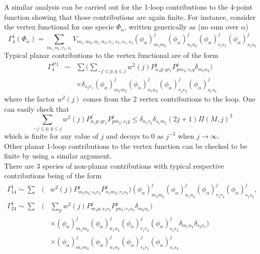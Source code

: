 \documentclass[10pt]{book}
\theoremstyle{break}
\begin{document}
A similar analysis can be carried out for the 1-loop contributions to the 4-point function showing that those contributions are again finite. For instance, consider the vertex functional for one specie $\Phi_\alpha$, written generically as (no sum over $\alpha$)
\begin{equation*}
\Gamma^1_4(\Phi_\alpha)=\sum_{m_i,n_i,r_i,s_i} V_{m_1,m_2,n_1,n_2,r_1,r_2,s_1,s_2}(\phi_\alpha)^j_{m_1m_2}(\phi_\alpha)^j_{n_1n_2}(\phi_\alpha)^j_{r_1r_2}(\phi_\alpha)^j_{s_1s_2}%
\end{equation*}
Typical planar contributions to the vertex functional are of the form
\begin{eqnarray*}
\Gamma^{P\ 1}_4&\sim&\sum\big(\sum_{-j\le p,q\le j}w^2(j)P^j_{n_1p;qr_2}P^j_{pm_2;s_1q}\delta_{m_1n_2}\big)\nonumber\\
&&\times\delta_{s_2r_1} (\phi_\alpha)^j_{m_1m_2}(\phi_\alpha)^j_{n_1n_2}(\phi_\alpha)^j_{r_1r_2}(\phi_\alpha)^j_{s_1s_2}%
\end{eqnarray*}
where the factor $w^2(j)$ comes from the 2 vertex contributions to the loop. One can easily check that
\begin{equation*}
\sum_{-j\le p,q\le j}w^2(j)P^j_{n_1p;qr_2}P^j_{pm_2;s_1q}\le\delta_{n_1r_2}
\delta_{s_1m_2}(2j+1)\Pi(M,j)^2%
\end{equation*}
which is finite for any value of $j$ and decays to $0$ as $j^{-3}$ when $j\to\infty$. \\
Other planar 1-loop contributions to the vertex function can be checked to be finite by using a similar argument.\\
There are 3 species of non-planar contributions with typical respective contributions being of the form
\begin{eqnarray*}
\Gamma^1_{14}\sim\sum &\big(&w^2(j)P^j_{m_1n_2;s_1r_2}P^j_{n_1m_2;r_1s_2}\big)(\phi_\alpha)^j_{m_1m_2}(\phi_\alpha)^j_{n_1n_2}(\phi_\alpha)^j_{r_1r_2}(\phi_\alpha)^j_{s_1s_2}%
,\\
\Gamma^1_{24}\sim\sum&\big(&\sum_pw^2(j)P^j_{m_1p;s_1r_2}P^j_{pn_2;r_1s_2}\delta_{m_2n_1}\big)\nonumber\\
&&\times(\phi_\alpha)^j_{m_1m_2}(\phi_\alpha)^j_{n_1n_2}(\phi_\alpha)^j_{r_1r_2}(\phi_\alpha)^j_{s_1s_2}%
\delta_{m_1n_2}\delta_{s_2r_1} \big)\nonumber\\
&&\times(\phi_\alpha)^j_{m_1m_2}(\phi_\alpha)^j_{n_1n_2}(\phi_\alpha)^j_{r_1r_2}(\phi_\alpha)^j_{s_1s_2}%
\end{eqnarray*}
\end{document}

